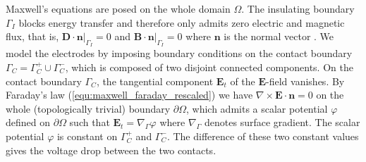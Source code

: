 \documentclass{article}
\begin{document}
Maxwell's equations are posed on the whole domain $\Omega$. The insulating boundary
$\Gamma_I$ blocks energy transfer and therefore only admits zero electric and magnetic
flux, that is, $\mathbf{D}\cdot \mathbf{n}|_{\Gamma_I} = 0$ and
$\mathbf{B} \cdot \mathbf{n}|_{\Gamma_I} = 0$ where $\mathbf{n}$ is the normal vector
\cite{Hiptmair_2021}. We model the electrodes by imposing boundary conditions on the
contact boundary $\Gamma_C = \Gamma_C^+\cup \Gamma_C^-$, which is composed of two disjoint
connected components. On the contact boundary $\Gamma_C$, the tangential component
$\mathbf{E}_t$ of the $\mathbf{E}$-field vanishes. By Faraday's law
(\ref{equ:maxwell_faraday_rescaled}) we have
$\nabla \times \mathbf{E} \cdot \mathbf{n} = 0$ on the whole (topologically trivial)
boundary $\partial\Omega$, which admits a scalar potential $\varphi$ defined on
$\partial\Omega$ such that $\mathbf{E}_t = \nabla_\Gamma \varphi$ where $\nabla_\Gamma$
denotes surface gradient. The scalar potential $\varphi$ is constant on $\Gamma_C^+$ and
$\Gamma_C^-$. The difference of these two constant values gives the voltage drop between the
two contacts.
\end{document}
